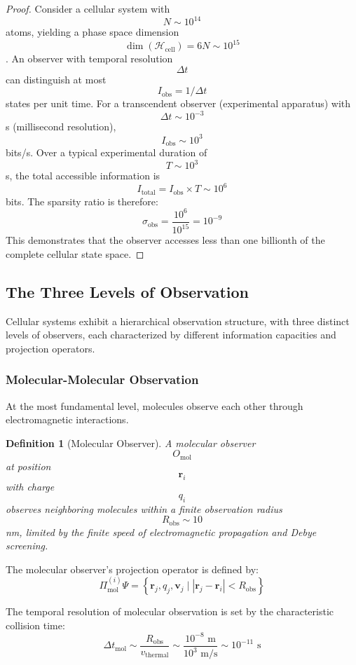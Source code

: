 \documentclass[11pt,twocolumn,a4paper]{article}
\newtheorem{definition}[theorem]{Definition}
\theoremstyle{remark}
\begin{document}
\begin{proof}
Consider a cellular system with $$N \sim 10^{14}$$ atoms, yielding a phase space dimension $$\dim(\mathcal{H}_{\mathrm{cell}}) = 6N \sim 10^{15}$$. An observer with temporal resolution $$\Delta t$$ can distinguish at most $$I_{\mathrm{obs}} = 1/\Delta t$$ states per unit time. For a transcendent observer (experimental apparatus) with $$\Delta t \sim 10^{-3}$$ s (millisecond resolution), $$I_{\mathrm{obs}} \sim 10^3$$ bits/s. Over a typical experimental duration of $$T \sim 10^3$$ s, the total accessible information is $$I_{\mathrm{total}} = I_{\mathrm{obs}} \times T \sim 10^6$$ bits. The sparsity ratio is therefore:
$$
\sigma_{\mathrm{obs}} = \frac{10^6}{10^{15}} = 10^{-9}
$$
This demonstrates that the observer accesses less than one billionth of the complete cellular state space.
\end{proof}

\subsection{The Three Levels of Observation}

Cellular systems exhibit a hierarchical observation structure, with three distinct levels of observers, each characterized by different information capacities and projection operators.

\subsubsection{Molecular-Molecular Observation}

At the most fundamental level, molecules observe each other through electromagnetic interactions.

\begin{definition}[Molecular Observer]
\label{def:molecular_observer}
A molecular observer $$O_{\mathrm{mol}}$$ at position $$\mathbf{r}_i$$ with charge $$q_i$$ observes neighboring molecules within a finite observation radius $$R_{\mathrm{obs}} \sim 10$$ nm, limited by the finite speed of electromagnetic propagation and Debye screening.
\end{definition}

The molecular observer's projection operator is defined by:
$$
\Pi_{\mathrm{mol}}^{(i)} \Psi = \left\{ \mathbf{r}_j, q_j, \mathbf{v}_j \mid |\mathbf{r}_j - \mathbf{r}_i| < R_{\mathrm{obs}} \right\}
$$

The temporal resolution of molecular observation is set by the characteristic collision time:
$$
\Delta t_{\mathrm{mol}} \sim \frac{R_{\mathrm{obs}}}{v_{\mathrm{thermal}}} \sim \frac{10^{-8} \text{ m}}{10^3 \text{ m/s}} \sim 10^{-11} \text{ s}
$$
\end{document}
